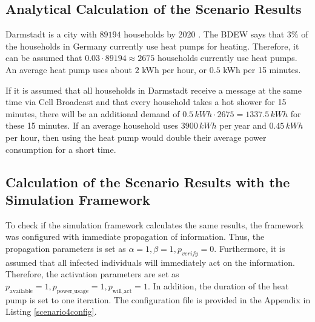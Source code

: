 \subsection{Analytical Calculation of the Scenario Results}

Darmstadt is a city with $89194$ households by 2020 
\cite{statistadarmstadt}. The BDEW
says that $3\%$ of the households in Germany currently use
heat pumps for heating. Therefore, it can be assumed that 
$0.03 \cdot 89194 \approx 2675$ households currently use 
heat pumps. An average heat pump uses about $2$ kWh per hour, 
or $0.5$ kWh per 15 minutes.

If it is assumed that all households in Darmstadt receive 
a message at the same time via Cell Broadcast and that
every household takes a hot shower for 15 minutes,
there will be an additional 
demand of $0.5\,kWh \cdot 2675 = 1337.5\,kWh $ for these 
15 minutes. If an average household uses $3900\,kWh$ 
per year and $0.45\,kWh$ per hour, then using the heat pump 
would double their average power consumption for a short time.

\subsection{Calculation of the Scenario Results with the Simulation Framework}
To check if the simulation framework calculates the same 
results, the framework was configured with immediate
propagation of information. Thus, the propagation
parameters is set as 
$\alpha=1, \beta=1, p_{verify}=0$. 
Furthermore, it is assumed that all infected 
individuals will immediately act on the information.
Therefore, the activation parameters are 
set as $p_{\mathrm{available}}=1, 
p_{\mathrm{power\_usage}}=1, p_{\mathrm{will\_act}}=1$.
In addition, the duration of the heat pump is set to one iteration.
The configuration file is provided in the Appendix in
Listing \ref{scenario4config}.

